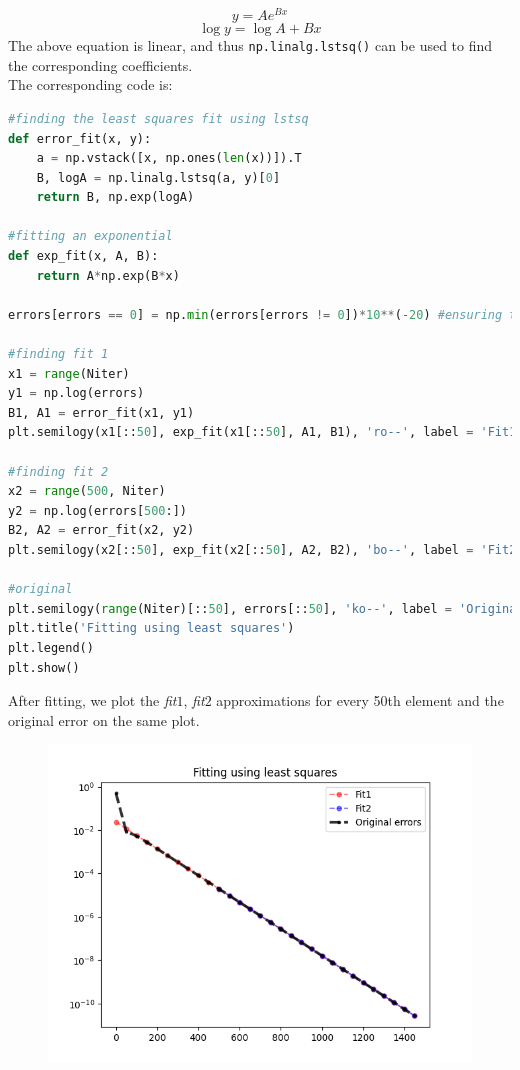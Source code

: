 \documentclass[11pt, a4paper]{article}
\begin{document}
\[y = Ae^{Bx} \]
\[\log{y} = \log{A} + Bx\]
The above equation is linear, and thus \texttt{np.linalg.lstsq()} can be used to find the corresponding coefficients. \\
The corresponding code is:
\\
\begin{lstlisting}[language = Python]
#finding the least squares fit using lstsq
def error_fit(x, y):
    a = np.vstack([x, np.ones(len(x))]).T
    B, logA = np.linalg.lstsq(a, y)[0]
    return B, np.exp(logA)

#fitting an exponential
def exp_fit(x, A, B):
    return A*np.exp(B*x)

errors[errors == 0] = np.min(errors[errors != 0])*10**(-20) #ensuring there are no zero values before taking log

#finding fit 1
x1 = range(Niter)
y1 = np.log(errors)
B1, A1 = error_fit(x1, y1)
plt.semilogy(x1[::50], exp_fit(x1[::50], A1, B1), 'ro--', label = 'Fit1', ms = 5, alpha = 0.5)

#finding fit 2
x2 = range(500, Niter)
y2 = np.log(errors[500:])
B2, A2 = error_fit(x2, y2)
plt.semilogy(x2[::50], exp_fit(x2[::50], A2, B2), 'bo--', label = 'Fit2', ms = 5, alpha = 0.5)

#original
plt.semilogy(range(Niter)[::50], errors[::50], 'ko--', label = 'Original errors', ms = 3, linewidth = 3, alpha = 0.8)
plt.title('Fitting using least squares')
plt.legend()
plt.show()
\end{lstlisting}

After fitting, we plot the \textit{fit$1$}, \textit{fit$2$} approximations for every 50th element and the original error on the same plot.

\begin{figure}[H]
     \centering
     \includegraphics[scale=0.8]{Figure_5.png}
\end{figure}
\end{document}
